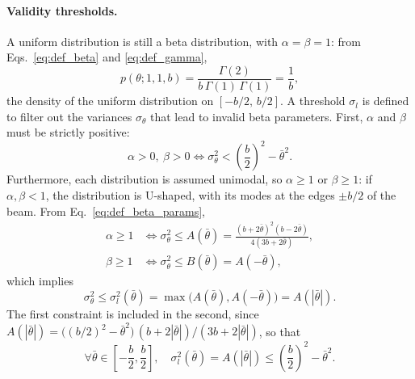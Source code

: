 \paragraph{Validity thresholds.} A uniform distribution is still a beta distribution, with
$\alpha = \beta = 1$: from Eqs.~\eqref{eq:def_beta} and \eqref{eq:def_gamma},
\begin{equation}                         %
  p(\theta; 1, 1, b) = \frac{\Gamma(2)}{b\,\Gamma(1)\,\Gamma(1)} = \frac{1}{b},
  \label{eq:msis_uniform}
\end{equation}
the density of the uniform distribution on $[-b/2,\, b/2]$. A threshold $\sigma_l$ is defined to filter
out the variances $\sigma_\theta$ that lead to invalid beta parameters. First, $\alpha$ and $\beta$ must
be strictly positive:
\begin{equation}                         %
  \alpha > 0,\ \beta > 0 \iff \sigma_\theta^2 < \left(\frac{b}{2}\right)^2 - \bar{\theta}^2.
  \label{eq:msis_valid}
\end{equation}
Furthermore, each distribution is assumed unimodal, so $\alpha \geq 1$ or $\beta \geq 1$: if
$\alpha, \beta < 1$, the distribution is U-shaped, with its modes at the edges $\pm b/2$ of the beam.
From Eq.~\eqref{eq:def_beta_params},
\begin{align}                            %
  \alpha \geq 1 &\iff \sigma_\theta^2 \leq A(\bar{\theta}) = \frac{(b + 2\bar{\theta})^2 (b - 2\bar{\theta})}{4(3b + 2\bar{\theta})}, \label{eq:msis_alpha1}\\
  \beta \geq 1  &\iff \sigma_\theta^2 \leq B(\bar{\theta}) = A(-\bar{\theta}),                                                   \label{eq:msis_beta1}
\end{align}
which implies
\begin{equation}                         %
  \sigma_\theta^2 \leq \sigma_l^2(\bar{\theta}) = \max\big(A(\bar{\theta}), A(-\bar{\theta})\big) = A(|\bar{\theta}|).
  \label{eq:msis_sigmal}
\end{equation}
The first constraint is included in the second, since
$A(|\bar{\theta}|) = \big((b/2)^2 - \bar{\theta}^2\big)\,(b + 2|\bar{\theta}|)/(3b + 2|\bar{\theta}|)$, so that
\begin{equation}                         %
  \forall \bar{\theta} \in \left[-\frac{b}{2}, \frac{b}{2}\right], \quad
  \sigma_l^2(\bar{\theta}) = A(|\bar{\theta}|) \leq \left(\frac{b}{2}\right)^2 - \bar{\theta}^2.
  \label{eq:msis_incl}
\end{equation}
